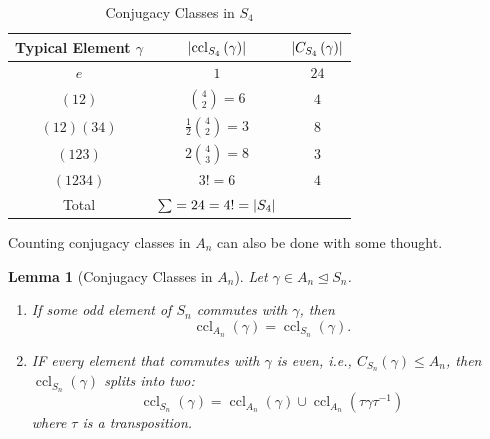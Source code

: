 \documentclass{article}
\newtheorem{lemma}[theorem]{Lemma}
\theoremstyle{definition}
\theoremstyle{remark}
\DeclarePairedDelimiter{\abs}{\lvert}{\rvert}
\newcommand{\pqty}[1]{\left(#1\right)}
\newcommand{\perm}[1]{(#1)}
\newcommand{\inverse}{^{-1}}
\newcommand{\normalsub}{\trianglelefteq}
\newcommand{\subgroup}{\leq}
\newcommand{\ccl}{\operatorname{ccl}}
\begin{document}
\begin{table}[ht!]
    \centering
    \begin{tabular}{ccc}
        Typical Element \(\gamma\) & \(\abs{\ccl_{S_4} \pqty{\gamma}}\) & \(\abs{C_{S_4} \pqty{\gamma}}\) \\
        \hline\hline
        \(e\) & \(1\) & \(24\) \\
        \(\perm{12}\) & \(\binom{4}{2} = 6\) & \(4\) \\
        \(\perm{12}\perm{34}\) & \(\frac{1}{2} \binom{4}{2} = 3\) & \(8\) \\
        \(\perm{123}\) & \(2 \binom{4}{3} = 8\) & \(3\) \\
        \(\perm{1234}\) & \(3! = 6\) & \(4\) \\
        \hline
        Total & \(\sum = 24 = 4! = \abs{S_4}\) &
    \end{tabular}
    \caption{Conjugacy Classes in \(S_4\)}
    \label{tab:conjugacy-class-s4}
\end{table}

Counting conjugacy classes in \(A_n\) can also be done with some thought.

\begin{lemma}[Conjugacy Classes in \(A_n\)]
    \label{lem:conjugacy-class-an}%
    Let \(\gamma \in A_n \normalsub S_n\).
    \begin{enumerate}
        \item If some odd element of \(S_n\) commutes with \(\gamma\), then
        \[
            \ccl_{A_n} \pqty{\gamma} = \ccl_{S_n} \pqty{\gamma}.
        \]
        \item IF every element that commutes with \(\gamma\) is even, i.e., \(C_{S_n} \pqty{\gamma} \subgroup A_n\), then \(\ccl_{S_n} \pqty{\gamma}\) splits into two:
        \[
            \ccl_{S_n} \pqty{\gamma} = \ccl_{A_n} \pqty{\gamma} \cup \ccl_{A_n} \pqty{\tau \gamma \tau\inverse}
        \]
        where \(\tau\) is a transposition.
    \end{enumerate}
\end{lemma}
\end{document}
